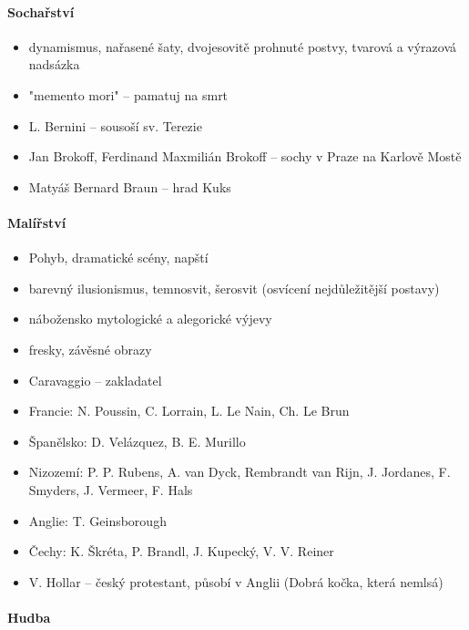 \paragraph{Sochařství}
\begin{itemize}
\item dynamismus, nařasené šaty, dvojesovitě prohnuté postvy, tvarová a výrazová nadsázka
\item "memento mori" -- pamatuj na smrt
\item L. Bernini -- sousoší sv. Terezie
\item Jan Brokoff, Ferdinand Maxmilián Brokoff -- sochy v Praze na Karlově Mostě
\item Matyáš Bernard Braun -- hrad Kuks
\end{itemize}

\paragraph{Malířství}
\begin{itemize}
\item Pohyb, dramatické scény, napští
\item barevný ilusionismus, temnosvit, šerosvit (osvícení nejdůležitější postavy)
\item nábožensko mytologické a alegorické výjevy
\item fresky, závěsné obrazy
\item Caravaggio -- zakladatel
\item Francie: N. Poussin, C. Lorrain, L. Le Nain, Ch. Le Brun
\item Španělsko: D. Velázquez, B. E. Murillo
\item Nizozemí: P. P. Rubens, A. van Dyck, Rembrandt van Rijn, J. Jordanes, F. Smyders, J. Vermeer, F. Hals
\item Anglie: T. Geinsborough
\item Čechy: K. Škréta, P. Brandl, J. Kupecký, V. V. Reiner
\item V. Hollar -- český protestant, působí v Anglii (Dobrá kočka, která nemlsá)
\end{itemize}

\paragraph{Hudba}





\timeline
